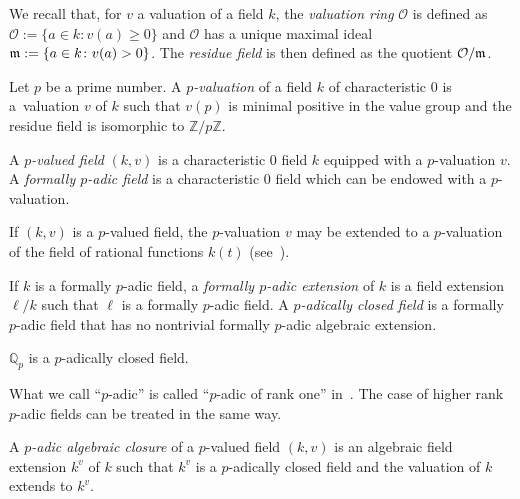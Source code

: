 \documentclass[10pt,a4paper]{amsart}
\numberwithin{equation}{section}
\newcommand{\Z}{\mathbb{Z}}
\newcommand{\Q}{\mathbb{Q}}
\begin{document}
We recall that, for $v$ a valuation of a field $k$, the \emph{valuation ring} $\mathcal{O}$ is defined as $\mathcal{O}:=\{a \in k \colon v(a) \geq 0 \}$ and $\mathcal{O}$ has a unique maximal ideal $\frak{m}:= \{a \in k \colon v(a) > 0 \}$. The \emph{residue field} is then defined as the quotient $\mathcal{O}/\frak{m}$.



\begin{Definition}
Let $p$ be a prime number. A \emph{$p$-valuation} of a field $k$ of characteristic 0 is a~valuation $v$ of $k$
such that $v(p)$ is minimal positive in the value group and the residue field is isomorphic to $\Z/p\Z$.

A \emph{$p$-valued field} $(k,v)$ is a characteristic 0 field $k$ equipped with a $p$-valuation $v$. A \emph{formally $p$-adic field} is a characteristic 0 field which can be endowed with a $p$-valuation.
\end{Definition}

\begin{Remark}\label{val} If $(k,v)$ is a $p$-valued field, the $p$-valuation $v$ may be extended to a $p$-valuation of the field of rational functions $k(t)$ (see~\cite[Example~2.2]{PR}).
\end{Remark}

\begin{Definition} If $k$ is a formally $p$-adic field, a \emph{formally $p$-adic extension} of $k$ is a field extension $\ell/k$ such that $\ell$ is a formally $p$-adic field. A \emph{$p$-adically closed field} is a formally $p$-adic field that has no nontrivial formally $p$-adic algebraic extension.
\end{Definition}


\begin{Example} $\Q_p$ is a $p$-adically closed field.
\end{Example}

\begin{Remark} What we call ``$p$-adic'' is called ``$p$-adic of rank one'' in~\cite{PR}. The case of higher rank $p$-adic fields
can be treated in the same way.
\end{Remark}

\begin{Definition} A \emph{$p$-adic algebraic closure} of a $p$-valued field $(k,v)$ is an algebraic field extension $k^v$ of $k$ such that $k^v$ is a $p$-adically closed field and the valuation of $k$ extends to $k^v$.
\end{Definition}
\end{document}

